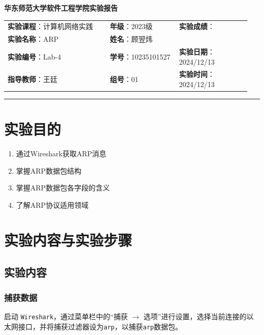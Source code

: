 \documentclass{article}
\begin{document}
	\begin{center}
		{\Large{\textbf{\heiti 华东师范大学软件工程学院实验报告}}}
		\begin{table}[htb]
			\flushleft
			\begin{tabular}{p{0.4\linewidth}p{0.27\linewidth}p{0.28\linewidth}}\\
				\textbf{实验课程}：计算机网络实践  & \textbf{年级}：2023级       & \textbf{实验成绩}：  \\
				\textbf{实验名称}：ARP & \textbf{姓名}：顾翌炜         &                 \\
				\textbf{实验编号}：Lab-4     & \textbf{学号}：10235101527 & \textbf{实验日期}：2024/12/13  \\
				\textbf{指导教师}：王廷     & \textbf{组号}：01            & \textbf{实验时间}：2024/12/13  \\ 
			\end{tabular}
		\end{table}
	\end{center}
	\rule{\textwidth}{2pt}
	
	\section{实验目的}
	
	\begin{enumerate}[noitemsep, label={{\arabic*})}]
		\item 通过Wireshark获取ARP消息
		\item 掌握ARP数据包结构
		\item 掌握ARP数据包各字段的含义
		\item 了解ARP协议适用领域
	\end{enumerate}
	
	\section{实验内容与实验步骤}
	
	\subsection{实验内容}
	
	\subsubsection{捕获数据}
	
	启动 \texttt{Wireshark}，通过菜单栏中的“捕获 $\to$ 选项”进行设置，选择当前连接的以太网接口，并将捕获过滤器设为\texttt{arp}，以捕获\texttt{arp}数据包。
	
\end{document}

